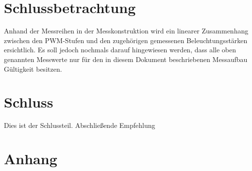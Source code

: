 \documentclass[a4paper,12pt]{scrartcl}
\begin{document}
    
    
\clearpage
\section{Schlussbetrachtung}
Anhand der Messreihen in der Messkonstruktion wird ein linearer Zusammenhang zwischen den PWM-Stufen und den zugehörigen gemessenen Beleuchtungsstärken
ersichtlich. Es soll jedoch nochmals darauf hingewiesen werden, dass alle oben genannten Messwerte nur für den in diesem Dokument beschriebenen Messaufbau
Gültigkeit besitzen.


\clearpage
\section{Schluss}
Dies ist der Schlussteil. Abschlie\ss{}ende Empfehlung

\section{Anhang}
\end{document}
